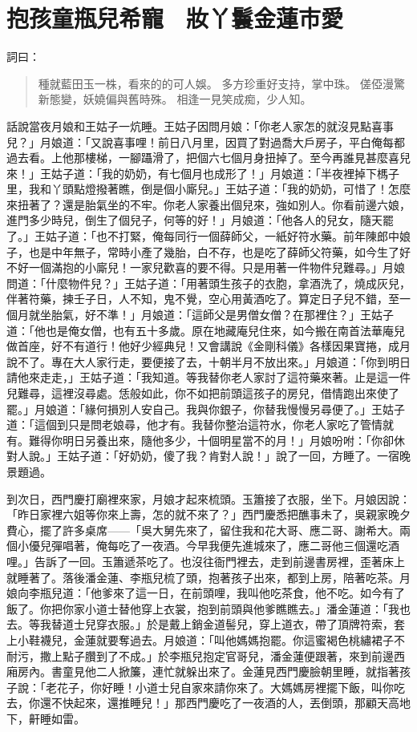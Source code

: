 
\chapter{抱孩童瓶兒希寵　妝丫鬟金蓮市愛}

詞曰：
\begin{quote}
種就藍田玉一株，看來的的可人娛。
多方珍重好支持，掌中珠。
傞俹漫驚新態變，妖嬈偏與舊時殊。
相逢一見笑成痴，少人知。
\end{quote}

話說當夜月娘和王姑子一炕睡。王姑子因問月娘：「你老人家怎的就沒見點喜事兒？」月娘道：「又說喜事哩！前日八月里，因買了對過喬大戶房子，平白俺每都過去看。上他那樓梯，一腳躡滑了，把個六七個月身扭掉了。至今再誰見甚麼喜兒來！」王姑子道：「我的奶奶，有七個月也成形了！」月娘道：「半夜裡掉下榪子里，我和丫頭點燈撥著瞧，倒是個小廝兒。」王姑子道：「我的奶奶，可惜了！怎麼來扭著了？還是胎氣坐的不牢。你老人家養出個兒來，強如別人。你看前邊六娘，進門多少時兒，倒生了個兒子，何等的好！」月娘道：「他各人的兒女，隨天罷了。」王姑子道：「也不打緊，俺每同行一個薛師父，一紙好符水藥。前年陳郎中娘子，也是中年無子，常時小產了幾胎，白不存，也是吃了薛師父符藥，如今生了好不好一個滿抱的小廝兒！一家兒歡喜的要不得。只是用著一件物件兒難尋。」月娘問道：「什麼物件兒？」王姑子道：「用著頭生孩子的衣胞，拿酒洗了，燒成灰兒，伴著符藥，揀壬子日，人不知，鬼不覺，空心用黃酒吃了。算定日子兒不錯，至一個月就坐胎氣，好不準！」月娘道：「這師父是男僧女僧？在那裡住？」王姑子道：「他也是俺女僧，也有五十多歲。原在地藏庵兒住來，如今搬在南首法華庵兒做首座，好不有道行！他好少經典兒！又會講說《金剛科儀》各樣因果寶捲，成月說不了。專在大人家行走，要便接了去，十朝半月不放出來。」月娘道：「你到明日請他來走走，」王姑子道：「我知道。等我替你老人家討了這符藥來著。止是這一件兒難尋，這裡沒尋處。恁般如此，你不如把前頭這孩子的房兒，借情跑出來使了罷。」月娘道：「緣何損別人安自己。我與你銀子，你替我慢慢另尋便了。」王姑子道：「這個到只是問老娘尋，他才有。我替你整治這符水，你老人家吃了管情就有。難得你明日另養出來，隨他多少，十個明星當不的月！」月娘吩咐：「你卻休對人說。」王姑子道：「好奶奶，傻了我？肯對人說！」說了一回，方睡了。一宿晚景題過。

到次日，西門慶打廟裡來家，月娘才起來梳頭。玉簫接了衣服，坐下。月娘因說：「昨日家裡六姐等你來上壽，怎的就不來了？」西門慶悉把醮事未了，吳親家晚夕費心，擺了許多桌席——「吳大舅先來了，留住我和花大哥、應二哥、謝希大。兩個小優兒彈唱著，俺每吃了一夜酒。今早我便先進城來了，應二哥他三個還吃酒哩。」告訴了一回。玉簫遞茶吃了。也沒往衙門裡去，走到前邊書房裡，歪著床上就睡著了。落後潘金蓮、李瓶兒梳了頭，抱著孩子出來，都到上房，陪著吃茶。月娘向李瓶兒道：「他爹來了這一日，在前頭哩，我叫他吃茶食，他不吃。如今有了飯了。你把你家小道士替他穿上衣裳，抱到前頭與他爹瞧瞧去。」潘金蓮道：「我也去。等我替道士兒穿衣服。」於是戴上銷金道髻兒，穿上道衣，帶了頂牌符索，套上小鞋襪兒，金蓮就要奪過去。月娘道：「叫他媽媽抱罷。你這蜜褐色桃繡裙子不耐污，撒上點子臢到了不成。」於李瓶兒抱定官哥兒，潘金蓮便跟著，來到前邊西廂房內。書童見他二人掀簾，連忙就躲出來了。金蓮見西門慶臉朝里睡，就指著孩子說：「老花子，你好睡！小道士兒自家來請你來了。大媽媽房裡擺下飯，叫你吃去，你還不快起來，還推睡兒！」那西門慶吃了一夜酒的人，丟倒頭，那顧天高地下，鼾睡如雷。

